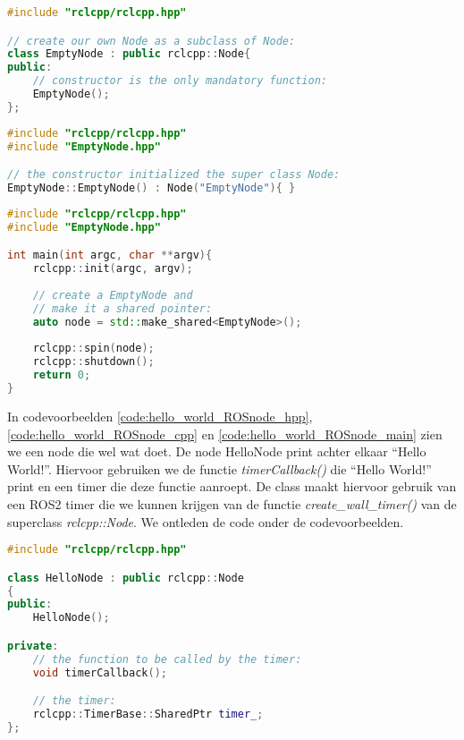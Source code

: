 \begin{lstlisting}[language=C++, caption={EmptyNode.hpp}, firstnumber=0, label={code:min_eigen_ROSnode_hpp}]
#include "rclcpp/rclcpp.hpp" 

// create our own Node as a subclass of Node:
class EmptyNode : public rclcpp::Node{
public:
    // constructor is the only mandatory function: 
    EmptyNode();
};
\end{lstlisting}

\begin{lstlisting}[language=C++, caption={EmptyNode.cpp}, firstnumber=0, label={code:min_eigen_ROSnode_cpp}]
#include "rclcpp/rclcpp.hpp" 
#include "EmptyNode.hpp"

// the constructor initialized the super class Node:
EmptyNode::EmptyNode() : Node("EmptyNode"){ }
\end{lstlisting}

\begin{lstlisting}[language=C++, caption={main.cpp}, firstnumber=0, label={code:min_eigen_ROSnode_main}]
#include "rclcpp/rclcpp.hpp"
#include "EmptyNode.hpp"

int main(int argc, char **argv){
    rclcpp::init(argc, argv);
    
    // create a EmptyNode and
    // make it a shared pointer:
    auto node = std::make_shared<EmptyNode>();
    
    rclcpp::spin(node); 
    rclcpp::shutdown(); 
    return 0;
}
\end{lstlisting}

\noindent In codevoorbeelden \ref{code:hello_world_ROSnode_hpp}, \ref{code:hello_world_ROSnode_cpp} en \ref{code:hello_world_ROSnode_main} zien we een node die wel wat doet. De node HelloNode print achter elkaar ``Hello World!''. Hiervoor gebruiken we de functie \textit{timerCallback()} die ``Hello World!'' print en een timer die deze functie aanroept. De class maakt hiervoor gebruik van een ROS2 timer die we kunnen krijgen van de functie \textit{create\_wall\_timer()} van de superclass \textit{rclcpp::Node}. We ontleden de code onder de codevoorbeelden. 

\begin{lstlisting}[language=C++, caption={HelloNode.hpp}, firstnumber=0, label={code:hello_world_ROSnode_hpp}]
#include "rclcpp/rclcpp.hpp"

class HelloNode : public rclcpp::Node
{
public:
    HelloNode();

private:
    // the function to be called by the timer:
    void timerCallback();

    // the timer:
    rclcpp::TimerBase::SharedPtr timer_;
};

\end{lstlisting}

